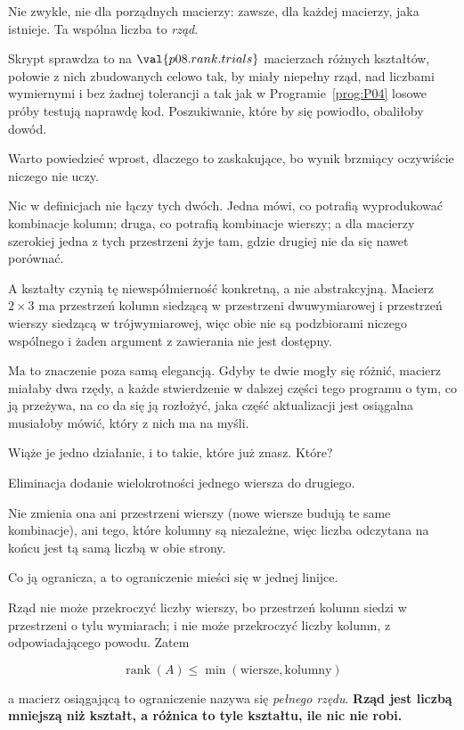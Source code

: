 \begin{fr}
Nie zwykle, nie dla porządnych macierzy: zawsze, dla każdej macierzy, jaka
istnieje. Ta wspólna liczba to \emph{rząd}.

Skrypt sprawdza to na $\val{p08.rank.trials}$ macierzach różnych kształtów,
połowie z nich zbudowanych celowo tak, by miały niepełny rząd, nad liczbami
wymiernymi i bez żadnej tolerancji \dash{} a tak jak w Programie~\ref{prog:P04}
losowe próby testują naprawdę kod. Poszukiwanie, które by się powiodło,
obaliłoby dowód.
\end{fr}

\begin{fr}
Warto powiedzieć wprost, dlaczego to zaskakujące, bo wynik brzmiący oczywiście
niczego nie uczy.

Nic w definicjach nie łączy tych dwóch. Jedna mówi, co potrafią wyprodukować
kombinacje kolumn; druga, co potrafią kombinacje wierszy; a dla macierzy
szerokiej jedna z tych przestrzeni żyje tam, gdzie drugiej nie da się nawet
porównać.

A kształty czynią tę niewspółmierność konkretną, a nie abstrakcyjną. Macierz
$2 \times 3$ ma przestrzeń kolumn siedzącą w przestrzeni dwuwymiarowej i
przestrzeń wierszy siedzącą w trójwymiarowej, więc obie nie są podzbiorami
niczego wspólnego i żaden argument z zawierania nie jest dostępny.

Ma to znaczenie poza samą elegancją. Gdyby te dwie mogły się różnić, macierz
miałaby dwa rzędy, a każde stwierdzenie w dalszej części tego programu \dash{}
o tym, co ją przeżywa, na co da się ją rozłożyć, jaka część aktualizacji jest
osiągalna \dash{} musiałoby mówić, który z nich ma na myśli.

Wiąże je jedno działanie, i to takie, które już znasz. Które?
\dotline
\nextframe
\end{fr}

\begin{fr}
\begin{ansblock}
Eliminacja \dash{} dodanie wielokrotności jednego wiersza do drugiego.
\end{ansblock}

Nie zmienia ona ani przestrzeni wierszy (nowe wiersze budują te same
kombinacje), ani tego, które kolumny są niezależne, więc liczba odczytana na
końcu jest tą samą liczbą w obie strony.

Co ją ogranicza, a to ograniczenie mieści się w jednej linijce.

Rząd nie może przekroczyć liczby wierszy, bo przestrzeń kolumn siedzi w
przestrzeni o tylu wymiarach; i nie może przekroczyć liczby kolumn, z
odpowiadającego powodu. Zatem

\[ \operatorname{rank}(A) \le \min(\text{wiersze}, \text{kolumny}) \]

a macierz osiągającą to ograniczenie nazywa się \emph{pełnego rzędu}.
\textbf{Rząd jest liczbą mniejszą niż kształt, a różnica to tyle kształtu, ile
nic nie robi.}
\end{fr}

